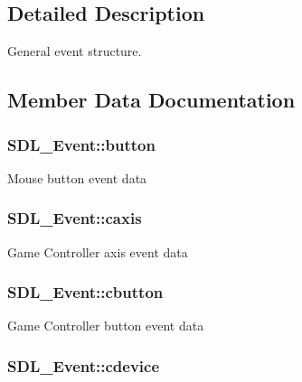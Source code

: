 \subsection{Detailed Description}
General event structure. 

\subsection{Member Data Documentation}
\hypertarget{union_s_d_l___event_ab6da2fa2687e5f849f270adecc64785f}{
\subsubsection[{button}]{ S\-D\-L\-\_\-\-Event\-::button}}\label{union_s_d_l___event_ab6da2fa2687e5f849f270adecc64785f}
Mouse button event data \hypertarget{union_s_d_l___event_aa8f6df0f2716fae56204b12ab4a4c289}{
\subsubsection[{caxis}]{ S\-D\-L\-\_\-\-Event\-::caxis}}\label{union_s_d_l___event_aa8f6df0f2716fae56204b12ab4a4c289}
Game Controller axis event data \hypertarget{union_s_d_l___event_aee2b5671c8dcdb447023715cc21593cb}{
\subsubsection[{cbutton}]{ S\-D\-L\-\_\-\-Event\-::cbutton}}\label{union_s_d_l___event_aee2b5671c8dcdb447023715cc21593cb}
Game Controller button event data \hypertarget{union_s_d_l___event_ad3beed01e690b885728e0b0e1d636378}{
\subsubsection[{cdevice}]{ S\-D\-L\-\_\-\-Event\-::cdevice}}\label{union_s_d_l___event_ad3beed01e690b885728e0b0e1d636378}
